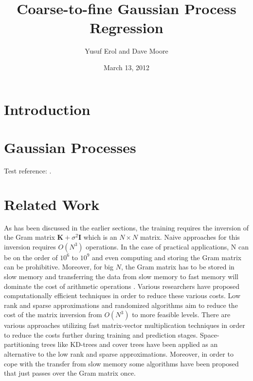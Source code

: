 \documentclass{article}
\begin{document}
\title{Coarse-to-fine Gaussian Process Regression}
\author{Yusuf Erol and Dave Moore}
\date{March 13, 2012}
\maketitle

\section{Introduction}

\section{Gaussian Processes}

Test reference: \cite{rasmussen06}. 

\section{Related Work}
As has been discussed in the earlier sections, the training requires the inversion of the Gram matrix $\mathbf{K}+\sigma^2\mathbf{I}$ which is an $N\times N$ matrix. Naive approaches for this inversion requires $O(N^3)$ operations. In the case of practical applications, N can be on the order of $10^6$ to $10^9$ and even computing and storing the Gram matrix can be prohibitive. Moreover, for big $N$, the Gram matrix has to be stored in slow memory and transferring the data from slow memory to fast memory will dominate the cost of arithmetic operations \cite{RandomizedMatrixDecompose}.  Various researchers have proposed computationally efficient techniques in order to reduce these various costs. Low rank and sparse approximations and randomized algorithms aim to reduce the cost of the matrix inversion from $O(N^3)$ to more feasible levels. There are various approaches utilizing fast matrix-vector multiplication techniques in order to reduce the costs further during training and prediction stages. Space-partitioning trees like KD-trees and cover trees have been applied as an alternative to the low rank and sparse approximations. Moreover, in order to cope with the transfer from slow memory some algorithms have been proposed that just passes over the Gram matrix once.
\end{document}
